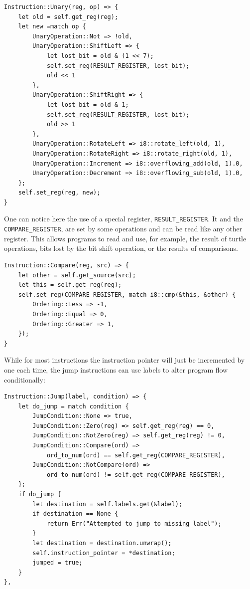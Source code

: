 \documentclass{report}
\begin{document}
\begin{verbatim}
Instruction::Unary(reg, op) => {
    let old = self.get_reg(reg);
    let new =match op {
        UnaryOperation::Not => !old,
        UnaryOperation::ShiftLeft => {
            let lost_bit = old & (1 << 7);
            self.set_reg(RESULT_REGISTER, lost_bit);
            old << 1
        },
        UnaryOperation::ShiftRight => {
            let lost_bit = old & 1;
            self.set_reg(RESULT_REGISTER, lost_bit);
            old >> 1
        },
        UnaryOperation::RotateLeft => i8::rotate_left(old, 1),
        UnaryOperation::RotateRight => i8::rotate_right(old, 1),
        UnaryOperation::Increment => i8::overflowing_add(old, 1).0,
        UnaryOperation::Decrement => i8::overflowing_sub(old, 1).0,
    };
    self.set_reg(reg, new);
}
\end{verbatim}

One can notice here the use of a special register, \verb|RESULT_REGISTER|. It and the \verb|COMPARE_REGISTER|, are set by some operations and can be read like any other register. This allows programs to read and use, for example, the result of turtle operations, bits lost by the bit shift operation, or the results of comparisons.

\begin{verbatim}
Instruction::Compare(reg, src) => {
    let other = self.get_source(src);
    let this = self.get_reg(reg);
    self.set_reg(COMPARE_REGISTER, match i8::cmp(&this, &other) {
        Ordering::Less => -1,
        Ordering::Equal => 0,
        Ordering::Greater => 1,
    });
}
\end{verbatim}

While for most instructions the instruction pointer will just be incremented by one each time, the jump instructions can use labels to alter program flow conditionally:

\begin{verbatim}
Instruction::Jump(label, condition) => {
    let do_jump = match condition {
        JumpCondition::None => true,
        JumpCondition::Zero(reg) => self.get_reg(reg) == 0,
        JumpCondition::NotZero(reg) => self.get_reg(reg) != 0,
        JumpCondition::Compare(ord) =>
            ord_to_num(ord) == self.get_reg(COMPARE_REGISTER),
        JumpCondition::NotCompare(ord) =>
            ord_to_num(ord) != self.get_reg(COMPARE_REGISTER),
    };
    if do_jump {
        let destination = self.labels.get(&label);
        if destination == None {
            return Err("Attempted to jump to missing label");
        }
        let destination = destination.unwrap();
        self.instruction_pointer = *destination;
        jumped = true;
    }
},
\end{verbatim}
\end{document}
